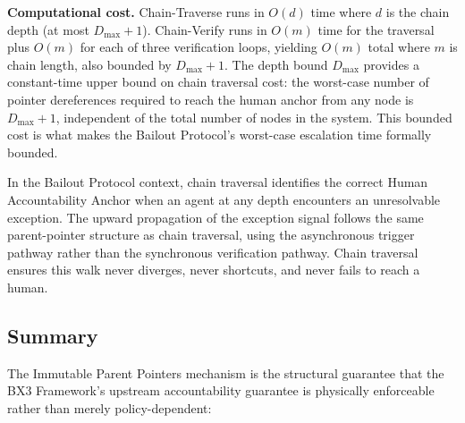 \bigskip
\noindent\textbf{Computational cost.} Chain-Traverse runs in $O(d)$ time where $d$ is the chain depth (at most $D_{\max} + 1$). Chain-Verify runs in $O(m)$ time for the traversal plus $O(m)$ for each of three verification loops, yielding $O(m)$ total where $m$ is chain length, also bounded by $D_{\max} + 1$. The depth bound $D_{\max}$ provides a constant-time upper bound on chain traversal cost: the worst-case number of pointer dereferences required to reach the human anchor from any node is $D_{\max} + 1$, independent of the total number of nodes in the system. This bounded cost is what makes the Bailout Protocol's worst-case escalation time formally bounded.

In the Bailout Protocol context, chain traversal identifies the correct Human Accountability Anchor when an agent at any depth encounters an unresolvable exception. The upward propagation of the exception signal follows the same parent-pointer structure as chain traversal, using the asynchronous trigger pathway rather than the synchronous verification pathway. Chain traversal ensures this walk never diverges, never shortcuts, and never fails to reach a human.

\subsection{Summary}

The Immutable Parent Pointers mechanism is the structural guarantee that the BX3 Framework's upstream accountability guarantee is physically enforceable rather than merely policy-dependent:

